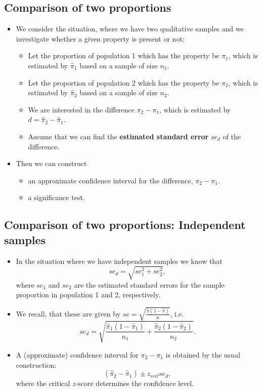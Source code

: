\documentclass[]{article}
\providecommand{\tightlist}{%
  \setlength{\itemsep}{0pt}\setlength{\parskip}{0pt}}
\begin{document}
\subsection{Comparison of two
proportions}\label{comparison-of-two-proportions-1}

\begin{itemize}
\tightlist
\item
  We consider the situation, where we have two qualitative samples and
  we investigate whether a given property is present or not:

  \begin{itemize}
  \tightlist
  \item
    Let the proportion of population 1 which has the property be
    \(\pi_1\), which is estimated by \(\hat{\pi}_1\) based on a sample
    of size \(n_1\).
  \item
    Let the proportion of population 2 which has the property be
    \(\pi_2\), which is estimated by \(\hat{\pi}_2\) based on a sample
    of size \(n_2\).
  \item
    We are interested in the difference \(\pi_2-\pi_1\), which is
    estimated by \(d=\hat{\pi}_2-\hat{\pi}_1\).
  \item
    Assume that we can find the \textbf{estimated standard error}
    \(se_d\) of the difference.
  \end{itemize}
\item
  Then we can construct

  \begin{itemize}
  \tightlist
  \item
    an approximate confidence interval for the difference,
    \(\pi_2 - \pi_1\).
  \item
    a significance test.
  \end{itemize}
\end{itemize}

\subsection{Comparison of two proportions: Independent
samples}\label{comparison-of-two-proportions-independent-samples}

\begin{itemize}
\tightlist
\item
  In the situation where we have independent samples we know that \[
    se_d=\sqrt{se_1^2+se_2^2},
    \] where \(se_1\) and \(se_2\) are the estimated standard errors for
  the sample proportion in population 1 and 2, respectively.
\item
  We recall, that these are given by
  \(se=\sqrt{\frac{\hat{\pi}(1-\hat{\pi})}{n}}\), i.e. \[
    se_d = \sqrt{\frac{\hat{\pi}_1(1-\hat{\pi}_1)}{n_1}+\frac{\hat{\pi}_2(1-\hat{\pi}_2)}{n_2}}.
    \]
\item
  A (approximate) confidence interval for \(\pi_2-\pi_1\) is obtained by
  the usual construction:\\
  \[
    (\hat{\pi}_2-\hat{\pi}_1)\pm z_{crit}se_d,
    \] where the critical \(z\)-score determines the confidence level.
\end{itemize}
\end{document}
